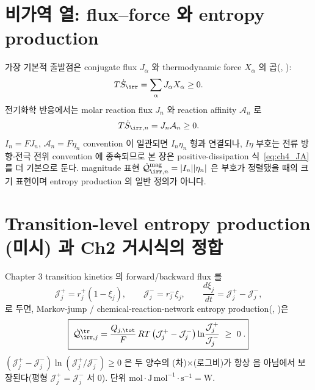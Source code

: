 \section{비가역 열: flux--force 와 entropy production}\label{sec:ch4_irr}
가장 기본적 출발점은 conjugate flux $J_\alpha$ 와 thermodynamic force $X_\alpha$ 의 곱(\cite{degrootmazur1962,onsager1931,prigogine1967}, ):
\begin{equation}
T\dot S_{\irr}=\sum_\alpha J_\alpha X_\alpha\ge0.
\label{eq:ch4_fluxforce}
\end{equation}
전기화학 반응에서는 molar reaction flux $J_n$ 와 reaction affinity $\mathcal A_n$ 로
\begin{equation}
T\dot S_{\irr,n}=J_n\mathcal A_n\ge0.
\label{eq:ch4_JA}
\end{equation}
$I_n=FJ_n$, $\mathcal A_n=F\eta_n$ convention 이 일관되면 $I_n\eta_n$ 형과 연결되나, $I\eta$ 부호는 전류
방향$\cdot$전극 전위 convention 에 종속되므로 본 장은 positive-dissipation 식~\eqref{eq:ch4_JA} 를 더 기본으로
둔다. magnitude 표현 $\dot{\mathcal Q}_{\irr,n}^{\mathrm{mag}}=|I_n||\eta_n|$ 은 부호가 정렬됐을 때의 크기
표현이며 entropy production 의 일반 정의가 아니다.

\section{Transition-level entropy production (미시) 과 Ch2 거시식의 정합}\label{sec:ch4_tr}
Chapter 3 transition kinetics 의 forward/backward flux 를
\begin{equation}
\mathcal J_j^+=r_j^+(1-\xi_j),\qquad \mathcal J_j^-=r_j^-\xi_j,\qquad \frac{d\xi_j}{dt}=\mathcal J_j^+-\mathcal J_j^-,
\label{eq:ch4_Jpm}
\end{equation}
로 두면, Markov-jump / chemical-reaction-network entropy production(\cite{schnakenberg1976,prigogine1967}, )은
\begin{equation}
\boxed{\;\dot{\mathcal Q}_{\irr,j}^{\tr}=\frac{Q_{j,\tot}}{F}\,RT\,\big(\mathcal J_j^+-\mathcal J_j^-\big)\ln\!\frac{\mathcal J_j^+}{\mathcal J_j^-}\ \ge\ 0\;.}
\label{eq:ch4_tr_entropy}
\end{equation}
$(\mathcal J_j^+-\mathcal J_j^-)\ln(\mathcal J_j^+/\mathcal J_j^-)\ge0$ 은 두 양수의 (차)$\times$(로그비)가 항상
음 아님에서 보장된다(평형 $\mathcal J_j^+=\mathcal J_j^-$ 서 $0$). 단위 $\mathrm{mol}\cdot\mathrm{J\,mol^{-1}}\cdot\mathrm{s^{-1}}=\mathrm W$.


